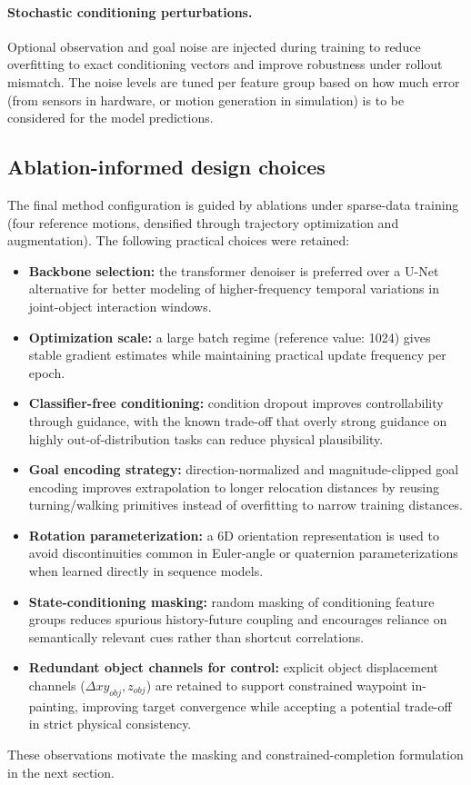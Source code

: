 \paragraph{Stochastic conditioning perturbations.}
Optional observation and goal noise are injected during training to reduce overfitting to exact conditioning vectors and improve robustness under rollout mismatch. The noise levels are tuned per feature group based on how much error (from sensors in hardware, or motion generation in simulation) is to be considered for the model predictions. 

\subsection{Ablation-informed design choices}

The final method configuration is guided by ablations under sparse-data training (four reference motions, densified through trajectory optimization and augmentation). The following practical choices were retained:
\begin{itemize}
    \item \textbf{Backbone selection:} the transformer denoiser is preferred over a U-Net alternative for better modeling of higher-frequency temporal variations in joint-object interaction windows.
    \item \textbf{Optimization scale:} a large batch regime (reference value: 1024) gives stable gradient estimates while maintaining practical update frequency per epoch.
    \item \textbf{Classifier-free conditioning:} condition dropout improves controllability through guidance, with the known trade-off that overly strong guidance on highly out-of-distribution tasks can reduce physical plausibility.
    \item \textbf{Goal encoding strategy:} direction-normalized and magnitude-clipped goal encoding improves extrapolation to longer relocation distances by reusing turning/walking primitives instead of overfitting to narrow training distances.
    \item \textbf{Rotation parameterization:} a 6D orientation representation is used to avoid discontinuities common in Euler-angle or quaternion parameterizations when learned directly in sequence models.
    \item \textbf{State-conditioning masking:} random masking of conditioning feature groups reduces spurious history-future coupling and encourages reliance on semantically relevant cues rather than shortcut correlations.
    \item \textbf{Redundant object channels for control:} explicit object displacement channels ($\Delta xy_{obj}, z_{obj}$) are retained to support constrained waypoint in-painting, improving target convergence while accepting a potential trade-off in strict physical consistency.
\end{itemize}
These observations motivate the masking and constrained-completion formulation in the next section.

